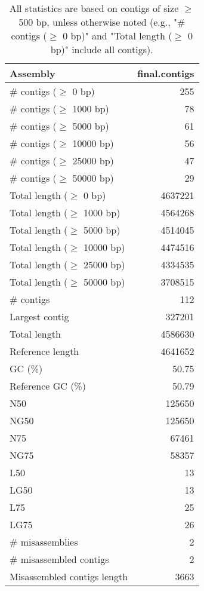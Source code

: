 \documentclass[12pt,a4paper]{article}
\begin{document}
\begin{table}[ht]
\begin{center}
\caption{All statistics are based on contigs of size $\geq$ 500 bp, unless otherwise noted (e.g., "\# contigs ($\geq$ 0 bp)" and "Total length ($\geq$ 0 bp)" include all contigs).}
\begin{tabular}{|l*{1}{|r}|}
\hline
Assembly & final.contigs \\ \hline
\# contigs ($\geq$ 0 bp) & 255 \\ \hline
\# contigs ($\geq$ 1000 bp) & 78 \\ \hline
\# contigs ($\geq$ 5000 bp) & 61 \\ \hline
\# contigs ($\geq$ 10000 bp) & 56 \\ \hline
\# contigs ($\geq$ 25000 bp) & 47 \\ \hline
\# contigs ($\geq$ 50000 bp) & 29 \\ \hline
Total length ($\geq$ 0 bp) & 4637221 \\ \hline
Total length ($\geq$ 1000 bp) & 4564268 \\ \hline
Total length ($\geq$ 5000 bp) & 4514045 \\ \hline
Total length ($\geq$ 10000 bp) & 4474516 \\ \hline
Total length ($\geq$ 25000 bp) & 4334535 \\ \hline
Total length ($\geq$ 50000 bp) & 3708515 \\ \hline
\# contigs & 112 \\ \hline
Largest contig & 327201 \\ \hline
Total length & 4586630 \\ \hline
Reference length & 4641652 \\ \hline
GC (\%) & 50.75 \\ \hline
Reference GC (\%) & 50.79 \\ \hline
N50 & 125650 \\ \hline
NG50 & 125650 \\ \hline
N75 & 67461 \\ \hline
NG75 & 58357 \\ \hline
L50 & 13 \\ \hline
LG50 & 13 \\ \hline
L75 & 25 \\ \hline
LG75 & 26 \\ \hline
\# misassemblies & 2 \\ \hline
\# misassembled contigs & 2 \\ \hline
Misassembled contigs length & 3663 \\ \hline

\end{tabular}
\end{center}
\end{table}
\end{document}
